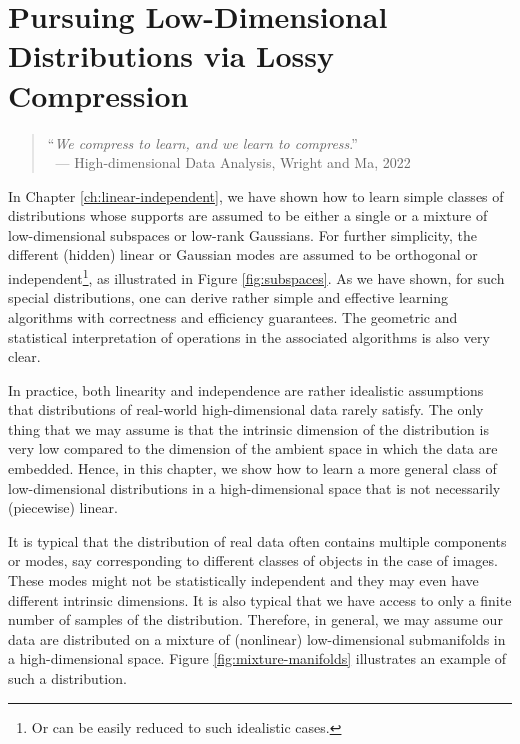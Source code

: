 \documentclass[../../book-main.tex]{subfiles}
\begin{document}
\chapter{Pursuing Low-Dimensional Distributions via Lossy Compression}
\label{ch:compression}\label{ch:general-distribution}

\begin{quote}
	\hfill    ``{\em We compress to learn, and we learn to compress}.''\\
	$~$ \hfill --- High-dimensional Data Analysis, Wright and Ma, 2022
\end{quote}
\vspace{5mm}

In Chapter \ref{ch:linear-independent}, we have shown how to learn simple classes of distributions whose supports are assumed to be either a single or a mixture of low-dimensional subspaces or low-rank Gaussians. For further simplicity, the different (hidden) linear or Gaussian modes are assumed to be orthogonal or independent\footnote{Or can be easily reduced to such idealistic cases.}, as illustrated in Figure \ref{fig:subspaces}. As we have shown, for such special distributions, one can derive rather simple and effective learning algorithms with correctness and efficiency guarantees. The geometric and statistical interpretation of operations in the associated algorithms is also very clear.

In practice, both linearity and independence are rather idealistic assumptions that distributions of real-world high-dimensional data rarely satisfy. The only thing that we may assume is that the intrinsic dimension of the distribution is very low compared to the dimension of the ambient space in which the data are embedded. Hence, in this chapter, we show how to learn a more general class of low-dimensional distributions in a high-dimensional space that is not necessarily (piecewise) linear.

It is typical that the distribution of real data often contains multiple components or modes, say corresponding to different classes of objects in the case of images. These modes might not be statistically independent and they may even have different intrinsic dimensions. It is also typical that we have access to only a finite number of samples of the distribution. Therefore, in  general, we may assume our data are distributed on a mixture of (nonlinear) low-dimensional submanifolds in a high-dimensional space. Figure \ref{fig:mixture-manifolds} illustrates an example of such a distribution.
\end{document}

